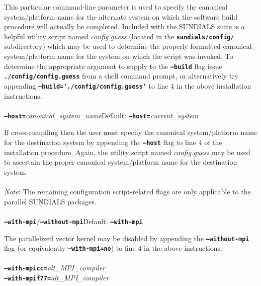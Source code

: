 This particular command-line parameter is used to specify the canonical system/platform name for the alternate system on which the software build procedure will actually be completed.  Included with the \small SUNDIALS \normalsize suite is a helpful utility script named \textit{config.guess} (located in the \texttt{\textbf{sundials/config/}} subdirectory) which may be used to determine the properly formatted canonical system/platform name for the system on which the script was invoked.  To determine the appropriate argument to supply to the \texttt{\textbf{--build}} flag issue \texttt{\textbf{./config/config.guess}} from a shell command prompt, or alternatively try appending \texttt{\textbf{--build=`./config/config.guess`}} to line \small 4 \normalsize in the above installation instructions.
\\
\\
\texttt{\textbf{--host=}}\textit{canonical\_system\_name}\hspace{0.5in}Default: \texttt{\textbf{--host=}}\textit{current\_system}\vspace{0.05in}

If cross-compiling then the user must specify the canonical system/platform name for the destination system by appending the \texttt{\textbf{--host}} flag to line \small 4 \normalsize of the installation procedure.  Again, the utility script named \textit{config.guess} may be used to ascertain the proper canonical system/platform name for the destination system.
\\
\\
\textit{Note}: The remaining configuration script-related flags are only applicable to the parallel \small SUNDIALS \normalsize packages.
\\
\\
\texttt{\textbf{--with-mpi}}/\texttt{\textbf{--without-mpi}}\hspace{0.5in}Default: \texttt{\textbf{--with-mpi}}\vspace{0.05in}

The parallelized vector kernel may be disabled by appending the \texttt{\textbf{--without-mpi}} flag (or equivalently \texttt{\textbf{--with-mpi=no}}) to line \small 4 \normalsize in the above instructions.
\\
\\
\texttt{\textbf{--with-mpicc=}}\textit{alt\_\small MPI\normalsize \_compiler}\\
\texttt{\textbf{--with-mpif77=}}\textit{alt\_\small MPI\normalsize \_compiler}\vspace{0.05in}

